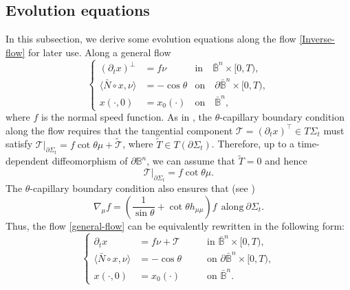 \documentclass[11pt,reqno]{amsart}
\theoremstyle{definition}
\theoremstyle{remark}
\numberwithin{equation}{section}
\renewcommand{\(}{\left(}
\renewcommand{\)}{\right)}
\renewcommand{\-}{\overline}
\begin{document}
\subsection{Evolution equations} In this subsection, we derive some evolution equations along the flow \eqref{Inverse-flow} for later use. Along a general flow
\begin{equation}\label{general-flow}
	\left\{\begin{aligned}
		\left(\partial_t x\right)^{\bot}&=f\nu &\text{in}\quad \bar{\mathbb{B}}^n \times[0,T),\\
		\langle\bar{N}\circ x,\nu\rangle&=-\cos\theta  &\text{on}\quad \partial\bar{\mathbb{B}}^n \times[0,T),\\
		x(\cdot,0)&=x_0(\cdot)  &\text{on} \quad \bar{\mathbb{B}}^n,
	\end{aligned}\right.
\end{equation}
where $f$ is the normal speed function. As in \cite[\S 2.4]{Weng-Xia2022}, the $\theta$-capillary boundary condition along the flow requires that the tangential component $\mathcal{T}=(\partial_tx)^\top\in T\Sigma_t$ must satisfy $\mathcal{T}\big|_{\partial\Sigma_t}=f\cot\theta\mu+\tilde{\mathcal{T}}$,  where $\tilde{T}\in T\left(\partial\Sigma_t\right)$. Therefore, up to a time-dependent diffeomorphism of $\partial\mathbb{B}^n$, we can assume that $\tilde{T}=0$ and hence
\begin{equation}\label{con-T}
	\mathcal{T}\big|_{\partial\Sigma_t}=f\cot\theta\mu.
\end{equation}
The $\theta$-capillary boundary condition also ensures that (see \cite[Prop. 2.12]{Weng-Xia2022})
\begin{equation}\label{de-boundary}
	\nabla_\mu f=\left(\frac{1}{\sin\theta}+\cot\theta h_{\mu\mu}\right)f\ \ \text{along}\ \partial\Sigma_t.
\end{equation}
Thus,  the flow \eqref{general-flow} can be equivalently rewritten in the following form:
\begin{equation}\label{s3:GL-flow}
	\left\{\begin{aligned}
		\partial_t x&=f\nu+\mathcal{T} \qquad &\text{in $\bar{\mathbb{B}}^n \times[0,T)$},\\
		\langle\bar{N}\circ x,\nu\rangle&=-\cos\theta &\text{on  $\partial\bar{\mathbb{B}}^n \times[0,T)$},\\
		x(\cdot,0)&=x_0(\cdot) &\text{on $\bar{\mathbb{B}}^n$}.
	\end{aligned}\right.
\end{equation}
\end{document}
